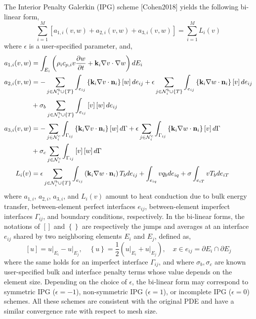 \begin{tcolorbox}[enhanced, breakable, title=Variational Formulation of the Governing Equations]
    The Interior Penalty Galerkin (IPG) scheme [Cohen2018] yields the following bi-linear form,
    \begin{equation}
        \sum_{i=1}^{M}\left[a_{1,i}(v,w) + a_{2,i}(v,w) + a_{3,i}(v,w)\right] = \sum_{i=1}^{M}L_i(v)
    \end{equation}
    where $\epsilon$ is a user-specified parameter, and,
    \begin{subequations}
        \begin{align}
            a_{1,i}(v,w) &= \int_{E_i}\left(\rho_i c_{p,i} v\frac{\partial w}{\partial t} + \mathbf{k}_i\nabla v\cdot\nabla w\right)dE_i\\
            a_{2,i}(v,w) &= -\sum_{j\in\mathcal{N}_i^{b}\cup\left\{T\right\}}\int_{e_{ij}}\left\{\mathbf{k}_i\nabla v\cdot \mathbf{n}_i\right\}\left[w\right]de_{ij} + \epsilon \sum_{j\in\mathcal{N}_i^{b}\cup\left\{T\right\}}\int_{e_{ij}}\left\{\mathbf{k}_i\nabla w\cdot \mathbf{n}_i\right\}\left[v\right]de_{ij}\notag\\ 
            &+ \sigma_b\sum_{j\in\mathcal{N}_i^{b}\cup\left\{T\right\}}\int_{e_{ij}}\left[v\right]\left[w\right]de_{ij}\\
            a_{3,i}(v,w) &= -\sum_{j\in\mathcal{N}_{i}^{c}}\int_{\Gamma_{ij}}\left\{\mathbf{k}_i\nabla v\cdot \mathbf{n}_i\right\}\left[w\right]d\Gamma + \epsilon \sum_{j\in\mathcal{N}_{i}^{c}}\int_{\Gamma_{ij}}\left\{\mathbf{k}_i\nabla w\cdot \mathbf{n}_i\right\}\left[v\right]d\Gamma\notag\\ 
            &+ \sigma_c\sum_{j\in\mathcal{N}_{i}^{c}}\int_{\Gamma_{ij}}\left[v\right]\left[w\right]d\Gamma\\
            L_i(v) &= \epsilon\sum_{j\in\mathcal{N}_i^{b}\cup\left\{T\right\}}\int_{e_{ij}} \left(\mathbf{k}_i\nabla w\cdot \mathbf{n}_i\right) T_b de_{ij} + \int_{e_{iq}} v q_b de_{iq} + \sigma\int_{e_{iT}} v T_b de_{iT}
        \end{align}
    \end{subequations}
    where $a_{1,i}$, $a_{2,i}$, $a_{3,i}$, and $L_i(v)$ amount to heat conduction due to bulk energy transfer, between-element perfect interfaces $e_{ij}$, between-element imperfect interfaces $\Gamma_{ij}$, and boundary conditions, respectively. In the bi-linear forms, the notations of $\left[\right]$ and $\left\{\right\}$ are respectively the jumps and averages at an interface $e_{ij}$ shared by two neighboring elements $E_i$ and $E_j$, defined as,
    \begin{equation}
        \left[u\right] = u\Big|_{E_i} - u\Big|_{E_j},\quad \left\{u\right\} = \frac{1}{2}\left(u\Big|_{E_i} + u\Big|_{E_j}\right),\quad x\in e_{ij}=\partial E_i\cap\partial E_j
    \end{equation}
    where the same holds for an imperfect interface $\Gamma_{ij}$, and where $\sigma_b,\sigma_c$ are known user-specified bulk and interface penalty terms whose value depends on the element size. Depending on the choice of $\epsilon$, the bi-linear form may correspond to symmetric IPG ($\epsilon=-1$), non-symmetric IPG ($\epsilon=1$), or incomplete IPG ($\epsilon=0$) schemes. All these schemes are consistent with the original PDE and have a similar convergence rate with respect to mesh size.
\end{tcolorbox}

